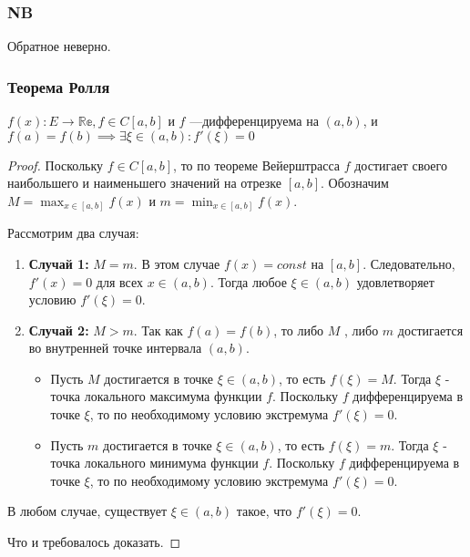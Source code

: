 \subsubsection*{NB} Обратное неверно.

\subsubsection{Теорема Ролля}
\( f(x): E \to \mathbb{Re}, f \in C[a,b] \) и $f$ ---дифференцируема на $(a,b)$, и \(f(a) = f(b) \implies \exists \xi \in (a,b): f'(\xi) = 0  \)

\begin{proof}
    Поскольку \(f \in C[a,b]\), то по теореме Вейерштрасса \(f\) достигает своего наибольшего и наименьшего значений на отрезке \([a, b]\).  Обозначим \(M = \max_{x \in [a,b]} f(x)\) и \(m = \min_{x \in [a,b]} f(x)\).

Рассмотрим два случая:

\begin{enumerate}
    \item \textbf{Случай 1:} \(M = m\).  В этом случае \(f(x) = const\) на \([a, b]\). Следовательно, \(f'(x) = 0\) для всех \(x \in (a, b)\).  Тогда любое \(\xi \in (a, b)\) удовлетворяет условию \(f'(\xi) = 0\).

    \item \textbf{Случай 2:} \(M > m\).  Так как \(f(a) = f(b)\), то либо \(M\) , либо \(m\) достигается во внутренней точке интервала \((a, b)\).

    \begin{itemize}
        \item Пусть \(M\) достигается в точке \(\xi \in (a, b)\), то есть \(f(\xi) = M\). Тогда \(\xi\) - точка локального максимума функции \(f\). Поскольку \(f\) дифференцируема в точке \(\xi\), то по необходимому условию экстремума \(f'(\xi) = 0\).

        \item Пусть \(m\) достигается в точке \(\xi \in (a, b)\), то есть \(f(\xi) = m\). Тогда \(\xi\) - точка локального минимума функции \(f\). Поскольку \(f\) дифференцируема в точке \(\xi\), то по необходимому условию экстремума \(f'(\xi) = 0\).
    \end{itemize}
\end{enumerate}

В любом случае, существует \(\xi \in (a, b)\) такое, что \(f'(\xi) = 0\).

Что и требовалось доказать.
\end{proof}

